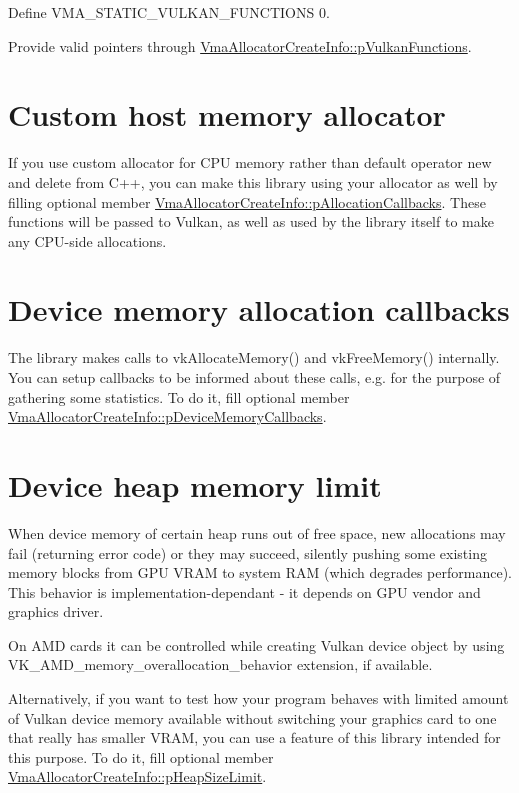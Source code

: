\begin{DoxyEnumerate}
\item Define {\ttfamily V\+M\+A\+\_\+\+S\+T\+A\+T\+I\+C\+\_\+\+V\+U\+L\+K\+A\+N\+\_\+\+F\+U\+N\+C\+T\+I\+O\+NS 0}.
\item Provide valid pointers through \hyperlink{structVmaAllocatorCreateInfo_a3dc197be3227da7338b1643f70db36bd}{Vma\+Allocator\+Create\+Info\+::p\+Vulkan\+Functions}.
\end{DoxyEnumerate}\hypertarget{configuration_custom_memory_allocator}{}\section{Custom host memory allocator}\label{configuration_custom_memory_allocator}
If you use custom allocator for C\+PU memory rather than default operator {\ttfamily new} and {\ttfamily delete} from C++, you can make this library using your allocator as well by filling optional member \hyperlink{structVmaAllocatorCreateInfo_a6e409087e3be55400d0e4ccbe43c608d}{Vma\+Allocator\+Create\+Info\+::p\+Allocation\+Callbacks}. These functions will be passed to Vulkan, as well as used by the library itself to make any C\+P\+U-\/side allocations.\hypertarget{configuration_allocation_callbacks}{}\section{Device memory allocation callbacks}\label{configuration_allocation_callbacks}
The library makes calls to {\ttfamily vk\+Allocate\+Memory()} and {\ttfamily vk\+Free\+Memory()} internally. You can setup callbacks to be informed about these calls, e.\+g. for the purpose of gathering some statistics. To do it, fill optional member \hyperlink{structVmaAllocatorCreateInfo_af1380969b5e1ea4c3184a877892d260e}{Vma\+Allocator\+Create\+Info\+::p\+Device\+Memory\+Callbacks}.\hypertarget{configuration_heap_memory_limit}{}\section{Device heap memory limit}\label{configuration_heap_memory_limit}
When device memory of certain heap runs out of free space, new allocations may fail (returning error code) or they may succeed, silently pushing some existing memory blocks from G\+PU V\+R\+AM to system R\+AM (which degrades performance). This behavior is implementation-\/dependant -\/ it depends on G\+PU vendor and graphics driver.

On A\+MD cards it can be controlled while creating Vulkan device object by using V\+K\+\_\+\+A\+M\+D\+\_\+memory\+\_\+overallocation\+\_\+behavior extension, if available.

Alternatively, if you want to test how your program behaves with limited amount of Vulkan device memory available without switching your graphics card to one that really has smaller V\+R\+AM, you can use a feature of this library intended for this purpose. To do it, fill optional member \hyperlink{structVmaAllocatorCreateInfo_a31c192aa6cbffa33279f6d9f0c47c44b}{Vma\+Allocator\+Create\+Info\+::p\+Heap\+Size\+Limit}. 